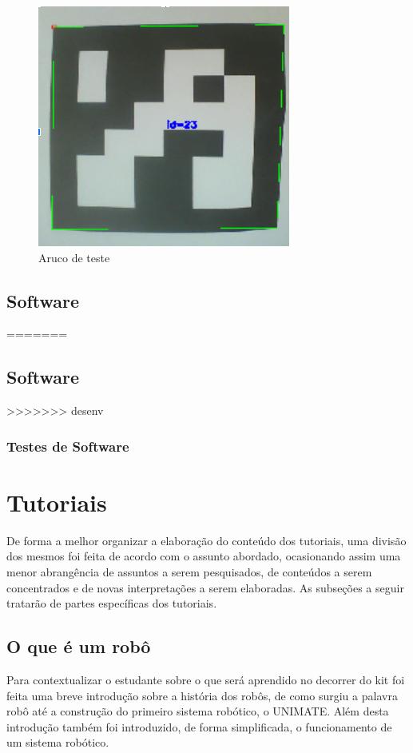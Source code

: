 \begin{figure}[H]
	\centering
	\includegraphics[scale=0.8, angle=0]{Figures/aruco1.png}
	\caption{Aruco de teste}
	\label{fig:aruco1}
\end{figure}

\subsection{Software}

=======

\subsection{Software}

>>>>>>> desenv
\subsubsection{Testes de Software}

\section{Tutoriais}
De forma a melhor organizar a elaboração do conteúdo dos tutoriais, uma divisão dos mesmos foi feita de acordo com o assunto abordado, ocasionando assim uma menor abrangência de assuntos a serem pesquisados, de conteúdos a serem concentrados e de novas interpretações a serem elaboradas. As subseções a seguir tratarão de partes específicas dos tutoriais.

\subsection{O que é um robô}
Para contextualizar o estudante sobre o que será aprendido no decorrer do kit foi feita uma breve introdução sobre a história dos robôs, de como surgiu a palavra robô até a construção do primeiro sistema robótico, o UNIMATE. Além desta introdução também foi introduzido, de forma simplificada, o funcionamento de um sistema robótico.

